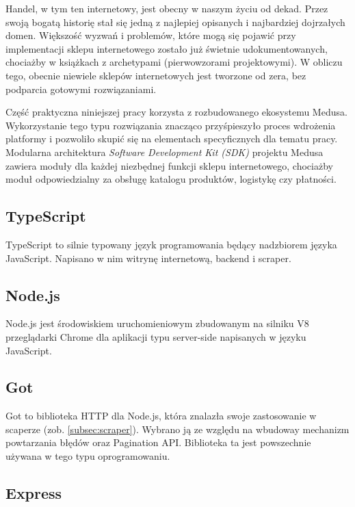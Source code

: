 Handel, w tym ten internetowy, jest obecny w naszym życiu od dekad.
Przez swoją bogatą historię stał się jedną z najlepiej opisanych i najbardziej dojrzałych domen.
Większość wyzwań i problemów, które mogą się pojawić przy implementacji sklepu internetowego zostało już świetnie udokumentowanych, chociażby w książkach z archetypami (pierwowzorami projektowymi).
W obliczu tego, obecnie niewiele sklepów internetowych jest tworzone od zera, bez podparcia gotowymi rozwiązaniami.

Część praktyczna niniejszej pracy korzysta z rozbudowanego ekosystemu Medusa\cite{medusajs-home}.
Wykorzystanie tego typu rozwiązania znacząco przyśpieszyło proces wdrożenia platformy i pozwoliło skupić się na elementach specyficznych dla tematu pracy.
Modularna architektura \emph{Software Development Kit (SDK)} projektu Medusa zawiera moduły dla każdej niezbędnej funkcji sklepu internetowego, chociażby moduł odpowiedzialny za obsługę katalogu produktów, logistykę czy płatności.

\subsection{TypeScript}\label{subsec:typescript}

TypeScript to silnie typowany język programowania będący nadzbiorem języka JavaScript.
Napisano w nim witrynę internetową, backend i scraper.

\subsection{Node.js}\label{subsec:nodejs}

Node.js jest środowiskiem uruchomieniowym zbudowanym na silniku V8 przeglądarki Chrome dla aplikacji typu server-side napisanych w języku JavaScript.

\subsection{Got}\label{subsec:got}

Got to biblioteka HTTP dla Node.js, która znalazła swoje zastosowanie w scaperze (zob. \autoref{subsec:scraper}).
Wybrano ją ze względu na wbudoway mechanizm powtarzania błędów oraz Pagination API\@.
Biblioteka ta jest powszechnie używana w tego typu oprogramowaniu.

\subsection{Express}\label{subsec:express}

